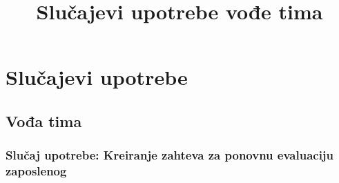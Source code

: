 \documentclass[a4paper]{article}
\title{Slučajevi upotrebe vođe tima}
\begin{document}
\maketitle

\section{Slučajevi upotrebe}

\subsection{Vođa tima}
\subsubsection{Slučaj upotrebe: Kreiranje zahteva za ponovnu evaluaciju zaposlenog}
\end{document}
